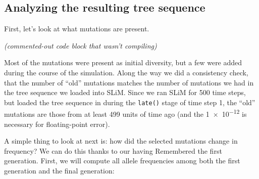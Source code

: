 \documentclass[12pt]{article}
\newcommand{\comment}[1]{\textit{\color{green} #1}}
\begin{document}
\subsection*{Analyzing the resulting tree sequence}

First, let’s look at what mutations are present.

\comment{(commented-out code block that wasn't compiling)}

Most of the mutations were present as initial diversity,
but a few were added during the course of the simulation.
Along the way we did a consistency check,
that the number of “old” mutations matches the number of mutations we had in the tree sequence we loaded into SLiM.
Since we ran SLiM for 500 time steps,
but loaded the tree sequence in during the \verb|late()| stage of time step 1,
the “old” mutations are those from at least 499 units of time ago
(and the \num{1e-12} is necessary for floating-point error).

A simple thing to look at next is:
how did the selected mutations change in frequency?
We can do this thanks to our having Remembered the first generation.
First, we will compute all allele frequencies among both the first generation and the final generation:
\end{document}
